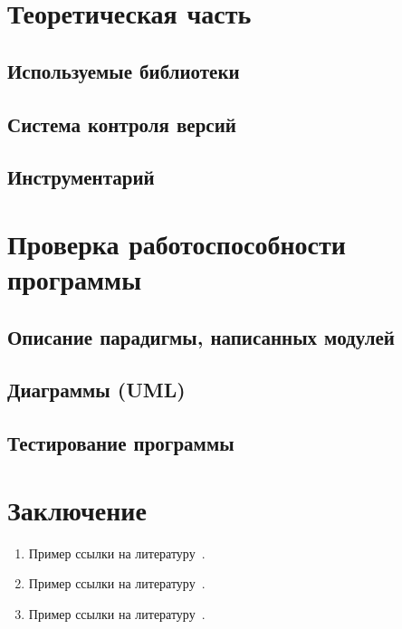 \documentclass[14pt, oneside]{altsu-report}
\begin{document}

\chapter{Теоретическая часть}\label{ch1}
\section{Используемые библиотеки}
\section{Система контроля версий}
\section{Инструментарий}

\chapter{Проверка работоспособности программы}\label{ch2}
\section{Описание парадигмы, написанных модулей}
\section{Диаграммы (UML)}
\section{Тестирование программы}

\chapter*{Заключение}

\begin{enumerate}
\item Пример ссылки на литературу~\cite{wikiRUBitbucket}.
\item Пример ссылки на литературу~\cite{wikiRUIdSoftware}.
\item Пример ссылки на литературу~\cite{wikiRUGitHub}.
\end{enumerate}

\newpage
{}
\printbibliography[title={Список использованной литературы}]
\end{document}
